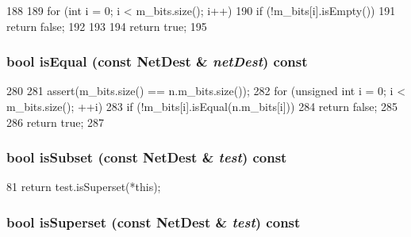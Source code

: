 \begin{DoxyCode}
188 {
189     for (int i = 0; i < m_bits.size(); i++) {
190         if (!m_bits[i].isEmpty()) {
191             return false;
192         }
193     }
194     return true;
195 }
\end{DoxyCode}
\hypertarget{classNetDest_a44890b1d643633daca78f39ba500a351}{
\subsubsection[{isEqual}]{\setlength{\rightskip}{0pt plus 5cm}bool isEqual (const {\bf NetDest} \& {\em netDest}) const}}
\label{classNetDest_a44890b1d643633daca78f39ba500a351}



\begin{DoxyCode}
280 {
281     assert(m_bits.size() == n.m_bits.size());
282     for (unsigned int i = 0; i < m_bits.size(); ++i) {
283         if (!m_bits[i].isEqual(n.m_bits[i]))
284             return false;
285     }
286     return true;
287 }
\end{DoxyCode}
\hypertarget{classNetDest_a9d92bf92ac849151b567a0976cc2dd96}{
\subsubsection[{isSubset}]{\setlength{\rightskip}{0pt plus 5cm}bool isSubset (const {\bf NetDest} \& {\em test}) const}}
\label{classNetDest_a9d92bf92ac849151b567a0976cc2dd96}



\begin{DoxyCode}
81 { return test.isSuperset(*this); }
\end{DoxyCode}
\hypertarget{classNetDest_a67c52cd92c924ccfeb6ca7e7a5949283}{
\subsubsection[{isSuperset}]{\setlength{\rightskip}{0pt plus 5cm}bool isSuperset (const {\bf NetDest} \& {\em test}) const}}
\label{classNetDest_a67c52cd92c924ccfeb6ca7e7a5949283}



